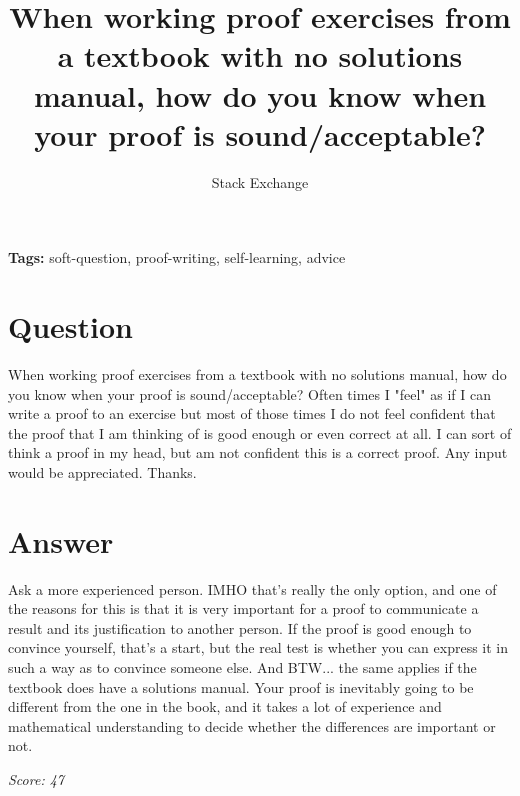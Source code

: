 \documentclass{article}
\title{When working proof exercises from a textbook with no solutions manual, how do you know when your proof is sound/acceptable?}
\author{Stack Exchange}
\date{}
\begin{document}
\maketitle

\noindent\textbf{Tags:} soft-question, proof-writing, self-learning, advice

\section*{Question}
When working proof exercises from a textbook with no solutions manual, how do you know when your proof is sound/acceptable? Often times I "feel" as if I can write a proof to an exercise but most of those times I do not feel confident that the proof that I am thinking of is good enough or even correct at all. I can sort of think a proof in my head, but am not confident this is a correct proof. Any input would be appreciated. Thanks.

\section*{Answer}
Ask a more experienced person. IMHO that's really the only option, and one of the reasons for this is that it is very important for a proof to communicate a result and its justification to another person. If the proof is good enough to convince yourself, that's a start, but the real test is whether you can express it in such a way as to convince someone else. And BTW... the same applies if the textbook does have a solutions manual. Your proof is inevitably going to be different from the one in the book, and it takes a lot of experience and mathematical understanding to decide whether the differences are important or not.

\vspace{1em}
\noindent\textit{Score: 47}
\end{document}
